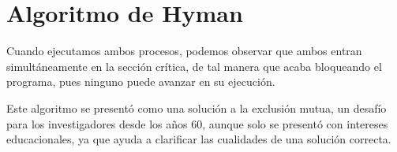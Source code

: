 \documentclass{article}
\begin{document}
\section{Algoritmo de Hyman}
Cuando ejecutamos ambos procesos, podemos observar que ambos entran simultáneamente en la sección crítica, de tal manera que acaba bloqueando el programa, pues ninguno puede avanzar en su ejecución.

Este algoritmo se presentó como una solución a la exclusión mutua, un desafío para los investigadores desde los años 60, aunque solo se presentó con intereses educacionales, ya que ayuda a clarificar las cualidades de una solución correcta.
\end{document}
